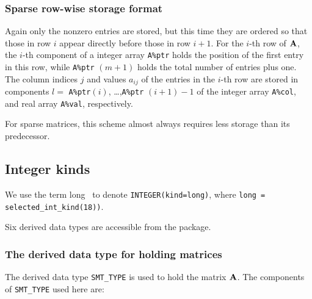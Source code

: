 \documentclass{galahad}
\begin{document}
\subsubsection{Sparse row-wise storage format}\label{rowwise}
Again only the nonzero entries are stored, but this time
they are ordered so that those in row $i$ appear directly before those
in row $i+1$. For the $i$-th row of ${\mathbf{A}}$, the $i$-th component of a 
integer array {\tt A\%ptr} holds the position of the first entry in this row,
while {\tt A\%ptr} $(m+1)$ holds the total number of entries plus one.
The column indices $j$ and values $a_{ij}$ of the entries in the $i$-th row 
are stored in components 
$l =$ {\tt A\%ptr}$(i)$, \ldots ,{\tt A\%ptr} $(i+1)-1$ of the 
integer array {\tt A\%col}, and real array {\tt A\%val}, respectively. 

For sparse matrices, this scheme almost always requires less storage than 
its predecessor.


\subsection{Integer kinds}\label{Integer kinds}
We use the term
long \integer\ to denote {\tt INTEGER\-(kind=long)}, where 
{\tt long = selected\_int\_kind(18))}.





\galtypes
Six derived data types are accessible from the package.


\subsubsection{The derived data type for holding matrices}\label{typesmt}
The derived data type {\tt SMT\_TYPE} is used to hold the matrix ${\mathbf{A}}$.
The components of {\tt SMT\_TYPE} used here are:
\end{document}
